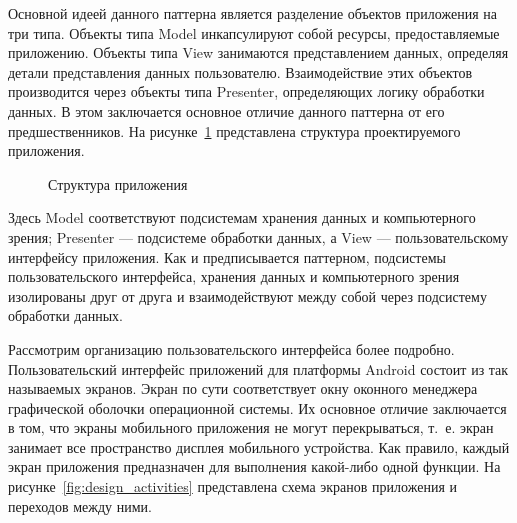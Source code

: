 Основной идеей данного паттерна является разделение объектов приложения на три типа.
Объекты типа Model инкапсулируют собой ресурсы, предоставляемые приложению.
Объекты типа View занимаются представлением данных, определяя
детали представления данных пользователю.
Взаимодействие этих объектов производится через объекты типа Presenter,
определяющих логику обработки данных.
В этом заключается основное отличие данного паттерна
от его предшественников.
На рисунке~\ref{fig:design_main} представлена структура проектируемого приложения.

\begin{figure}[h!]
  \centering
  \caption{Структура приложения}
  \label{fig:design_main}
\end{figure}

Здесь Model соответствуют подсистемам хранения данных и компьютерного зрения;
Presenter --- подсистеме обработки данных,
а View --- пользовательскому интерфейсу приложения.
Как и предписывается паттерном, подсистемы пользовательского интерфейса,
хранения данных и компьютерного зрения изолированы друг от друга и взаимодействуют
между собой через подсистему обработки данных.

Рассмотрим организацию пользовательского интерфейса более подробно.
Пользовательский интерфейс приложений для платформы Android состоит
из так называемых экранов.
Экран по сути соответствует окну оконного менеджера графической оболочки
операционной системы. Их основное отличие заключается в том,
что экраны мобильного приложения не могут перекрываться,
т.~е. экран занимает все пространство дисплея
мобильного устройства.
Как правило, каждый экран приложения предназначен
для выполнения какой-либо одной функции.
На рисунке~\ref{fig:design_activities} представлена схема экранов приложения
и переходов между ними.

